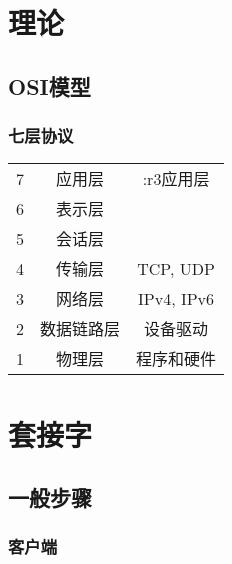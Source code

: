 \documentclass[hidelinks]{ctexart}
\begin{document}

\section{理论} %
\label{sec:理论}

\subsection{OSI模型} %
\label{sub:osi模型}

\subsubsection{七层协议} %
\label{ssub:七层协议}

\begin{table}[H]
\centering
\begin{tabular}{ccc}
\hline
 7 & 应用层 & \+:r3{应用层} \\
\cline{1-2}
 6 & 表示层 & \\
\cline{1-2}
 5 & 会话层 & \\
\Xhline{4\arrayrulewidth}
 4 & 传输层 & TCP, UDP \\
\hline
 3 & 网络层 & IPv4, IPv6 \\
\hline
 2 & 数据链路层 & 设备驱动 \\
\cline{1-2}
 1 & 物理层 & 程序和硬件 \\
\hline
\end{tabular}
\end{table}




\section{套接字} %
\label{sec:套接字}

\subsection{一般步骤} %
\label{sub:一般步骤}

\subsubsection{客户端} %
\label{ssub:客户端}
\end{document}
